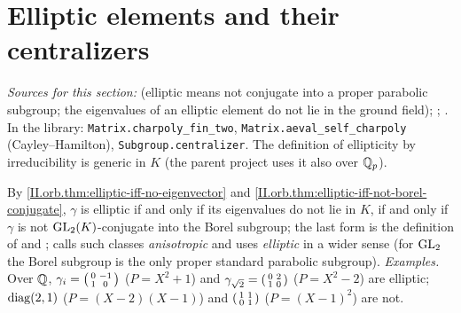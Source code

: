 \section{Elliptic elements and their centralizers}\label{sec:orb-centralizer}

\noindent\emph{Sources for this section:} \cite[Lecture II §1]{Gel} (elliptic means not conjugate into a proper parabolic subgroup; the
eigenvalues of an elliptic element do not lie in the ground field); \cite[§10]{AIntro}; \cite[§8]{A-I}. In the library:
\texttt{Matrix.\allowbreak charpoly\_fin\_two}, \texttt{Matrix.\allowbreak aeval\_self\_charpoly} (Cayley--Hamilton),
\texttt{Subgroup.\allowbreak centralizer}. The definition of ellipticity by irreducibility is generic in $K$ (the parent project uses it also over $\mathbb{Q}_p$).

\begin{definition}
\end{definition}
\noindent By \cref{II.orb.thm:elliptic-iff-no-eigenvector} and \cref{II.orb.thm:elliptic-iff-not-borel-conjugate}, $\gamma$ is elliptic if and only if
its eigenvalues do not lie in $K$, if and only if $\gamma$ is not $\mathrm{GL}_2(K)$-conjugate into the Borel subgroup; the last form is
the definition of \cite[Lecture II §1]{Gel} and \cite[§8]{A-I}; \cite[§10]{AIntro} calls such classes \emph{anisotropic} and uses
\emph{elliptic} in a wider sense (for $\mathrm{GL}_2$ the Borel subgroup is the only proper standard parabolic subgroup). \emph{Examples.} Over $\mathbb{Q}$, $\gamma_i=\begin{psmallmatrix}0&-1\\1&0\end{psmallmatrix}$ ($P=X^2+1$) and
$\gamma_{\sqrt2}=\begin{psmallmatrix}0&2\\1&0\end{psmallmatrix}$ ($P=X^2-2$) are elliptic; $\operatorname{diag}(2,1)$ ($P=(X-2)(X-1)$) and
$\begin{psmallmatrix}1&1\\0&1\end{psmallmatrix}$ ($P=(X-1)^2$) are not.

